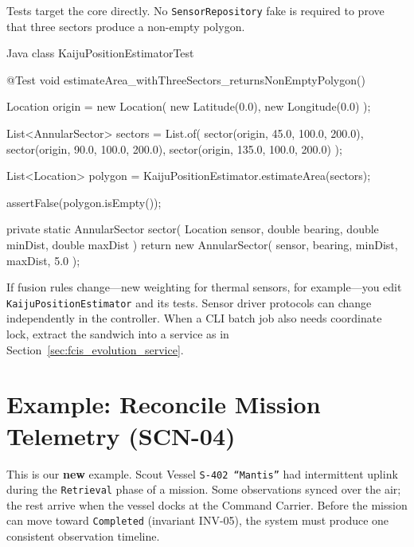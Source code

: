 Tests target the core directly. No \texttt{SensorRepository} fake is required to prove that three sectors produce a non-empty polygon.

\begin{ridercode}{Java}
class KaijuPositionEstimatorTest
{
    @Test
    void estimateArea_withThreeSectors_returnsNonEmptyPolygon()
    {
        Location origin = new Location(
            new Latitude(0.0),
            new Longitude(0.0)
        );

        List<AnnularSector> sectors = List.of(
            sector(origin, 45.0, 100.0, 200.0),
            sector(origin, 90.0, 100.0, 200.0),
            sector(origin, 135.0, 100.0, 200.0)
        );

        List<Location> polygon =
            KaijuPositionEstimator.estimateArea(sectors);

        assertFalse(polygon.isEmpty());
    }

    private static AnnularSector sector(
        Location sensor,
        double bearing,
        double minDist,
        double maxDist
    )
    {
        return new AnnularSector(
            sensor,
            bearing,
            minDist,
            maxDist,
            5.0
        );
    }
}
\end{ridercode}
\label{lst:fcis-triangulation-test}

If fusion rules change---new weighting for thermal sensors, for example---you edit \texttt{KaijuPositionEstimator} and its tests. Sensor driver protocols can change independently in the controller. When a CLI batch job also needs coordinate lock, extract the sandwich into a service as in Section~\ref{sec:fcis_evolution_service}.

\section{Example: Reconcile Mission Telemetry (SCN-04)}
\label{sec:fcis_example_reconciliation}

This is our \textbf{new} example. Scout Vessel \texttt{S-402 ``Mantis''} had intermittent uplink during the \texttt{Retrieval} phase of a mission. Some observations synced over the air; the rest arrive when the vessel docks at the Command Carrier. Before the mission can move toward \texttt{Completed} (invariant INV-05), the system must produce one consistent observation timeline.

